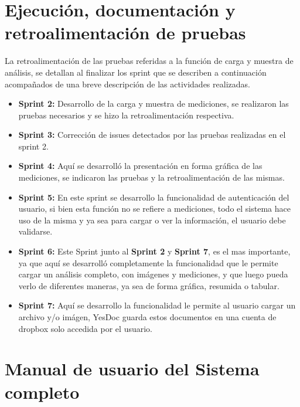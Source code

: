 \documentclass[a4paper,12pt]{article}
\begin{document}
\section{Ejecución, documentación y retroalimentación de pruebas}
 La retroalimentación de las pruebas referidas a la función de carga y muestra de análisis, se detallan al finalizar los sprint que se describen a continuación acompañados de una breve descripción de las actividades realizadas.
 \begin{itemize}
 	\item \textbf{Sprint 2:} Desarrollo de la carga y muestra de mediciones, se realizaron las pruebas necesarios y se hizo la retroalimentación respectiva.
 	\item \textbf{Sprint 3:} Corrección de issues detectados por las pruebas realizadas en el sprint 2.
 	\item \textbf{Sprint 4:} Aquí se desarrolló la presentación en forma gráfica de las mediciones, se indicaron las pruebas y la retroalimentación de las mismas.
 	\item \textbf{Sprint 5:} En este sprint se desarrollo la funcionalidad de autenticación del usuario, si bien esta función no se refiere a mediciones, todo el sistema hace uso de la misma y ya sea para cargar o ver la información, el usuario debe validarse.
 	\item \textbf{Sprint 6: } Este Sprint junto al \textbf{Sprint 2} y \textbf{Sprint 7}, es el mas importante, ya que aquí se desarrolló completamente la funcionalidad que le permite cargar un análisis completo, con imágenes y mediciones,  y que luego pueda verlo de diferentes maneras, ya sea de forma gráfica, resumida o tabular.
 	\item \textbf{Sprint 7: } Aquí se desarrollo la funcionalidad le permite al usuario cargar un archivo y/o imágen, YesDoc guarda estos documentos en una cuenta de dropbox solo accedida por el usuario.
 \end{itemize}
\section{Manual de usuario del Sistema completo} \label{manual_usuario}
\end{document}
